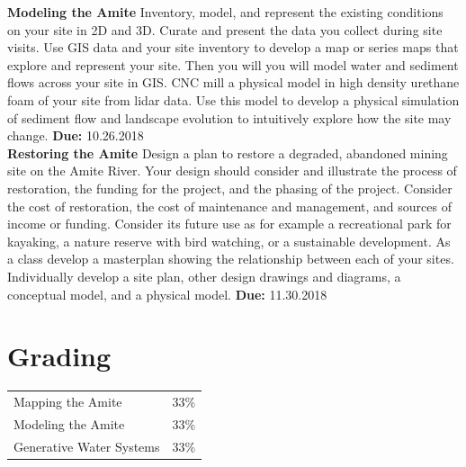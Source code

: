 \documentclass[11pt,article,oneside]{memoir}
\makeatletter
\newcommand{\globalcolor}[1]{%
  \color{#1}\global\let\default@color\current@color
}
\makeatother
\begin{document}
\noindent \textbf{Modeling the Amite}
Inventory, model, and represent the existing conditions
on your site in 2D and 3D.
Curate and present the data you collect during site visits.
Use GIS data and your site inventory
to develop a map or series maps that explore and represent your site.
Then you will you will model water and sediment flows across your site in GIS.
CNC mill a physical model in high density urethane foam
of your site from lidar data.
Use this model to develop a physical simulation of sediment flow
and landscape evolution to intuitively explore how the site may change.
\textbf{Due:} 10.26.2018 \\

\noindent \textbf{Restoring the Amite}
Design a plan to restore a degraded, abandoned mining site
on the Amite River.
Your design should consider and illustrate the process of restoration,
the funding for the project, and the phasing of the project.
Consider the cost of restoration, the cost of maintenance and management,
and sources of income or funding.
Consider its future use as for example
a recreational park for kayaking,
a nature reserve with bird watching,
or a sustainable development.
As a class develop a masterplan showing the relationship
between each of your sites.
Individually develop a site plan, other design drawings and diagrams,
a conceptual model, and a physical model.
\textbf{Due:} 11.30.2018 \\

\section{Grading}
%
\begin{table}[H]
\begin{tabular}{l r}
%
Mapping the Amite & 33\% \\
Modeling the Amite & 33\% \\
Generative Water Systems & 33\% \\
%
\end{tabular}
\end{table}

\clearpage


%
\end{document}
